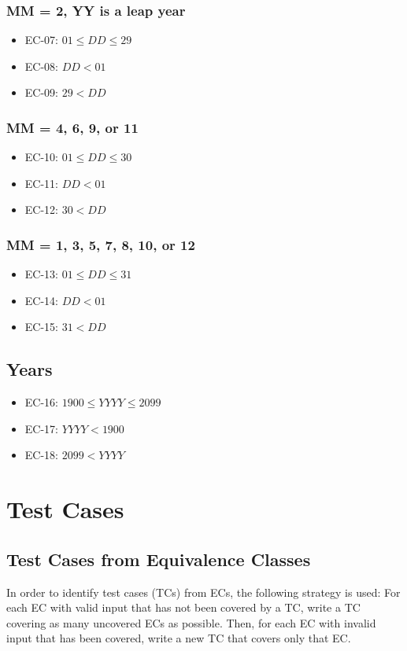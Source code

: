 \documentclass[11pt, oneside]{article}   	%
\begin{document}
\subsubsection{MM = 2, YY is a leap year}
	\begin{itemize}
		\item{EC-07: $01 \leq DD \leq 29$}
		\item{EC-08: $DD < 01$}
		\item{EC-09: $29 < DD$}
	\end{itemize}	
	
\subsubsection{MM = 4, 6, 9, or 11}
	\begin{itemize}
		\item{EC-10: $01 \leq DD \leq 30$}
		\item{EC-11: $DD < 01$}
		\item{EC-12: $30 < DD$}
	\end{itemize}
	
\subsubsection{MM = 1, 3, 5, 7, 8, 10, or 12}
	\begin{itemize}
		\item{EC-13: $01 \leq DD \leq 31$}
		\item{EC-14: $DD < 01$}
		\item{EC-15: $31 < DD$}
	\end{itemize}

\subsection{Years}
	\begin{itemize}
		\item{EC-16: $1900 \leq YYYY \leq 2099$}
		\item{EC-17: $YYYY < 1900$}
		\item{EC-18: $2099 < YYYY$}
	\end{itemize}

\section{Test Cases}
\subsection{Test Cases from Equivalence Classes}
In order to identify test cases (TCs) from ECs, the following strategy is used: For each EC with valid input that has not been covered by a TC, write a TC covering as many uncovered ECs as possible. Then, for each EC with invalid input that has been covered, write a new TC that covers only that EC.
\end{document}
